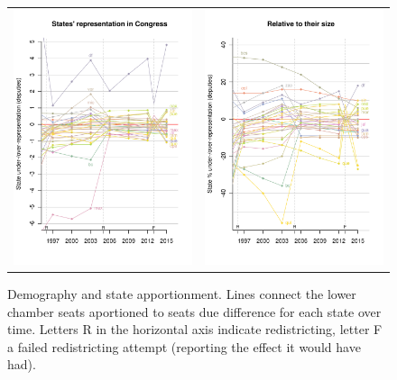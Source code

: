 \documentclass[letter,12pt]{article}
\begin{document}
\begin{figure}
\begin{center}
  \begin{tabular}{cc}
    \includegraphics[width=.45\columnwidth]{statesUnderOverRep.pdf} & 
    \includegraphics[width=.45\columnwidth]{statesUnderOverRep-rel.pdf} \\ 
  \end{tabular}
  \caption{Demography and state apportionment. Lines connect the lower chamber seats aportioned to seats due difference for each state over time. Letters R in the horizontal axis indicate redistricting, letter F a failed redistricting attempt (reporting the effect it would have had).}\label{F:underOverRep}
\end{center}
\end{figure}
\end{document}
